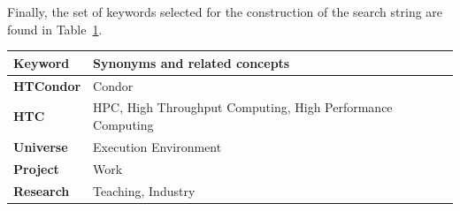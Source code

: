 Finally, the set of keywords selected for the construction of the search string are found in Table~\ref{table:database_search_keywords}.


\begin{table}
	{\begin{tabular}{p{2.0cm}p{7.0cm}} \toprule
			\textbf{Keyword}  & \textbf{Synonyms and related concepts}                     \\
			\midrule
			\textbf{HTCondor} & Condor                                                     \\
			\textbf{HTC}      & HPC, High Throughput Computing, High Performance Computing \\
			\textbf{Universe} & Execution Environment                                      \\
			\textbf{Project}  & Work                                                       \\
			\textbf{Research} & Teaching, Industry                                         \\
			\bottomrule
		\end{tabular}}
	\label{table:database_search_keywords}
\end{table}





